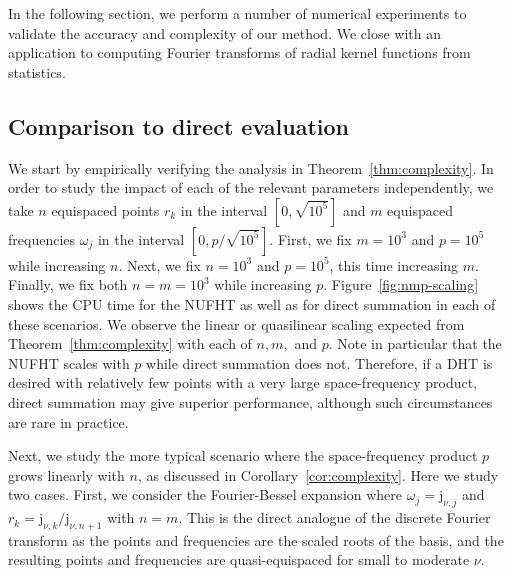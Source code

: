 In the following section, we perform a number of numerical experiments to
validate the accuracy and complexity of our method. We close with an application
to computing Fourier transforms of radial kernel functions from statistics.

\subsection{Comparison to direct evaluation}

We start by empirically verifying the analysis in Theorem~\ref{thm:complexity}.
In order to study the impact of each of the relevant parameters independently,
we take $n$ equispaced points $r_k$ in the interval $[0,\sqrt{10^5}]$ and $m$
equispaced frequencies $\omega_j$ in the interval $[0,p/\sqrt{10^5}]$. First, we
fix $m=10^3$ and $p=10^5$ while increasing $n$. Next, we fix $n=10^3$ and
$p=10^5$, this time increasing $m$. Finally, we fix both $n = m = 10^3$ while
increasing $p$. Figure~\ref{fig:nmp-scaling} shows the CPU time for the NUFHT as
well as for direct summation in each of these scenarios. We observe the linear
or quasilinear scaling expected from Theorem~\ref{thm:complexity} with each of
$n, m,$ and $p$. Note in particular that the NUFHT scales with $p$ while direct
summation does not. Therefore, if a DHT is desired with relatively few points
with a very large space-frequency product, direct summation may give superior
performance, although such circumstances are rare in practice.

Next, we study the more typical scenario where the space-frequency product $p$
grows linearly with $n$, as discussed in Corollary~\ref{cor:complexity}. Here we
study two cases. First, we consider the Fourier-Bessel expansion where $\omega_j
= \mathrm{j}_{\nu, j}$ and $r_k = \mathrm{j}_{\nu, k}/\mathrm{j}_{\nu, n+1}$
with $n = m$. This is the direct analogue of the discrete Fourier transform as
the points and frequencies are the scaled roots of the basis, and the resulting
points and frequencies are quasi-equispaced for small to moderate $\nu$. 

